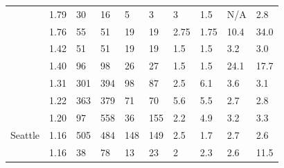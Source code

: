 \documentclass[utf8]{FrontiersinHarvard} %
\begin{document}
\begin{table}[h]
\begin{ssmall}
\begin{tabular}{llllllllll}
			\cite{Temereanca:2017aa}         & 1.79      & 30                                   & 16                                      & 5                            & 3                                          & 3         & 1.5       & N/A       & 2.8       \\
			\cite{Yu:2022aa}                 & 1.76      & 55                                   & 51                                      & 19                           & 19                                         & 2.75      & 1.75      & 10.4      & 34.0      \\
			\citet{sivay_hiv-1_2018}         & 1.42      & 51                                   & 51                                      & 19                           & 19                                         & 1.5       & 1.5       & 3.2       & 3.0       \\
			\cite{Zai:2020aa}                & 1.40      & 96                                   & 98                                      & 26                           & 27                                         & 1.5       & 1.5       & 24.1      & 17.7      \\ %
			\cite{Little:2014aa}             & 1.31      & 301                                  & 394                                     & 98                           & 87                                         & 2.5       & 6.1       & 3.6       & 3.1       \\ %
			\cite{brenner_role_2021}         & 1.22      & 363                                  & 379                                     & 71                           & 70                                         & 5.6       & 5.5       & 2.7       & 2.8       \\
			\cite{Stecher:2018aa}            & 1.20      & 97                                   & 558                                     & 36                           & 155                                        & 2.2       & 4.9       & 3.2       & 3.3       \\
			\cite{chato_public_2020} Seattle & 1.16      & 505                                  & 484                                     & 148                          & 149                                        & 2.5       & 1.7       & 2.7       & 2.6       \\
			\cite{Billings:2019aa}           & 1.16      & 38                                   & 78                                      & 13                           & 23                                         & 2         & 2.3       & 2.6       & 11.5      \\

\end{tabular}
\end{ssmall}
\end{table}
\end{document}

